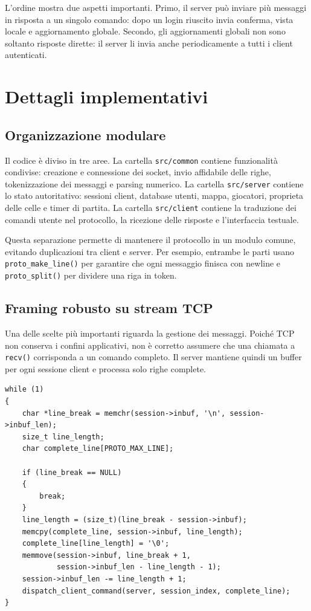 \documentclass[11pt,a4paper]{article}
\begin{document}
L'ordine mostra due aspetti importanti. Primo, il server può inviare più messaggi in risposta a un singolo comando: dopo un login riuscito invia conferma, vista locale e aggiornamento globale. Secondo, gli aggiornamenti globali non sono soltanto risposte dirette: il server li invia anche periodicamente a tutti i client autenticati.

\section{Dettagli implementativi}

\subsection{Organizzazione modulare}

Il codice è diviso in tre aree. La cartella \texttt{src/common} contiene funzionalità condivise: creazione e connessione dei socket, invio affidabile delle righe, tokenizzazione dei messaggi e parsing numerico. La cartella \texttt{src/server} contiene lo stato autoritativo: sessioni client, database utenti, mappa, giocatori, proprieta delle celle e timer di partita. La cartella \texttt{src/client} contiene la traduzione dei comandi utente nel protocollo, la ricezione delle risposte e l'interfaccia testuale.

Questa separazione permette di mantenere il protocollo in un modulo comune, evitando duplicazioni tra client e server. Per esempio, entrambe le parti usano \texttt{proto\_make\_line()} per garantire che ogni messaggio finisca con newline e \texttt{proto\_split()} per dividere una riga in token.

\subsection{Framing robusto su stream TCP}

Una delle scelte più importanti riguarda la gestione dei messaggi. Poiché TCP non conserva i confini applicativi, non è corretto assumere che una chiamata a \texttt{recv()} corrisponda a un comando completo. Il server mantiene quindi un buffer per ogni sessione client e processa solo righe complete.

\begin{lstlisting}[caption={Estrazione di righe complete dal buffer del server, tratto da \texttt{server.c}.}]
while (1)
{
    char *line_break = memchr(session->inbuf, '\n', session->inbuf_len);
    size_t line_length;
    char complete_line[PROTO_MAX_LINE];

    if (line_break == NULL)
    {
        break;
    }
    line_length = (size_t)(line_break - session->inbuf);
    memcpy(complete_line, session->inbuf, line_length);
    complete_line[line_length] = '\0';
    memmove(session->inbuf, line_break + 1,
            session->inbuf_len - line_length - 1);
    session->inbuf_len -= line_length + 1;
    dispatch_client_command(server, session_index, complete_line);
}
\end{lstlisting}
\end{document}
